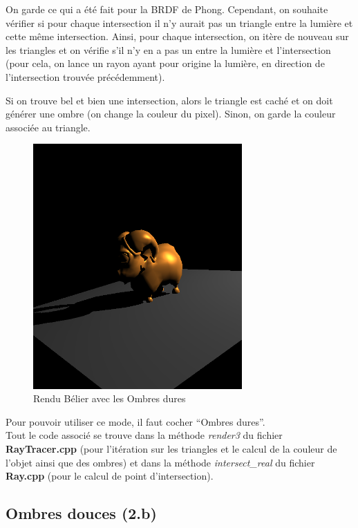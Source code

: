 \documentclass[a4paper,11pt,titlepage]{article}
\begin{document}
On garde ce qui a été fait pour la BRDF de Phong. Cependant, on souhaite vérifier si pour chaque intersection il n'y aurait pas un triangle entre la lumière et cette même intersection. Ainsi, pour chaque intersection, on itère de nouveau sur les triangles et on vérifie s'il n'y en a pas un entre la lumière et l'intersection (pour cela, on lance un rayon ayant pour origine la lumière, en direction de l'intersection trouvée précédemment).

Si on trouve bel et bien une intersection, alors le triangle est caché et on doit générer une ombre (on change la couleur du pixel). Sinon, on garde la couleur associée au triangle.\\

\begin{figure}[H]
 \begin{center}
 \includegraphics[bb=0 0 50 50,width=8cm]{Rendu/OmbresD.png}
 \end{center}

 \caption{Rendu Bélier avec les Ombres dures}
 \label{rendu3}
\end{figure}

Pour pouvoir utiliser ce mode, il faut cocher ``Ombres dures''.\\

Tout le code associé se trouve dans la méthode \textit{render3} du fichier \textbf{RayTracer.cpp} (pour l'itération sur les triangles et le calcul de la couleur de l'objet ainsi que des ombres) et dans la méthode \textit{intersect\_real} du fichier \textbf{Ray.cpp} (pour le calcul de point d'intersection).


\subsection{Ombres douces (2.b)}
\end{document}
